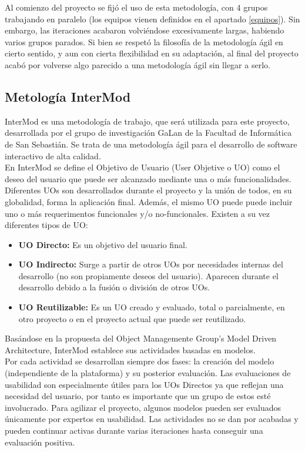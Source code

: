 Al comienzo del proyecto se fijó el uso de esta metodología, con 4 grupos trabajando en paralelo (los equipos vienen definidos en el apartado \ref{equipos}). Sin embargo, las iteraciones acabaron volviéndose excesivamente largas, habiendo varios grupos parados. Si bien se respetó la filosofía de la metodología ágil en cierto sentido, y aun con cierta flexibilidad en su adaptación, al final del proyecto acabó por volverse algo parecido a una metodología ágil sin llegar a serlo.\\

\subsection{Metología InterMod}
\label{intermod}

InterMod es una metodología de trabajo, que será utilizada para este proyecto, desarrollada por el grupo de investigación GaLan de la Facultad de Informática de San Sebastián. Se trata de una metodología ágil para el desarrollo de software interactivo de alta calidad.\\

En InterMod se define el Objetivo de Usuario (User Objetive o UO) como el deseo del usuario que puede ser alcanzado mediante una o más funcionalidades. Diferentes UOs son desarrollados durante el proyecto y la unión de todos, en su globalidad, forma la aplicación final. Además, el mismo UO puede puede incluir uno o más requerimentos funcionales y/o no-funcionales. Existen a su vez diferentes tipos de UO:

\begin{itemize}
\item \textbf{UO Directo:} Es un objetivo del usuario final.
\item \textbf{UO Indirecto:} Surge a partir de otros UOs por necesidades internas del desarrollo (no son propiamente deseos del usuario). Aparecen durante el desarrollo debido a la fusión o división de otros UOs.
\item \textbf{UO Reutilizable:} Es un UO creado y evaluado, total o parcialmente, en otro proyecto o en el proyecto actual que puede ser reutilizado.
\end{itemize}

Basándose en la propuesta del Object Managemente Group’s Model Driven Architecture, InterMod establece sus actividades basadas en modelos.\\

Por cada actividad se desarrollan siempre dos fases: la creación del modelo (independiente de la plataforma) y su posterior evaluación. Las evaluaciones de usabilidad son especialmente útiles para los UOs Directos ya que reflejan una necesidad del usuario, por tanto es importante que un grupo de estos esté involucrado. Para agilizar el proyecto, algunos modelos pueden ser evaluados únicamente por expertos en usabilidad. Las actividades no se dan por acabadas y pueden continuar activas durante varias iteraciones hasta conseguir una evaluación positiva.\\

